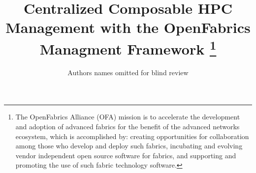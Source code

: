 \documentclass[conference]{IEEEtran}
\begin{document}
\title{Centralized Composable HPC Management with the OpenFabrics Managment Framework
\thanks{The OpenFabrics Alliance (OFA) mission is to accelerate the development and adoption of advanced fabrics for the benefit of the advanced networks ecosystem, which is accomplished by: creating opportunities for collaboration among those who develop and deploy such fabrics, incubating and evolving vendor independent open source software for fabrics, and supporting and promoting the use of such fabric technology software.}
}

\author{
    Authors names omitted for blind review
}

\maketitle
\end{document}
